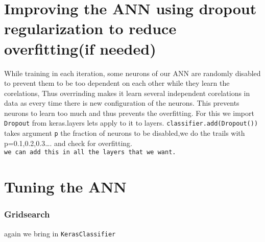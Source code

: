 \documentclass[11pt]{article}
\begin{document}
    \hypertarget{improving-the-ann-using-dropout-regularization-to-reduce-overfittingif-needed}{%
\section{Improving the ANN using dropout regularization to reduce
overfitting(if
needed)}\label{improving-the-ann-using-dropout-regularization-to-reduce-overfittingif-needed}}

    While training in each iteration, some neurons of our ANN are randomly
disabled to prevent them to be too dependent on each other while they
learn the corelations, Thus overrinding makes it learn several
independent corelations in data as every time there is new configuration
of the neurons. This prevents neurons to learn too much and thus
prevents the overfitting. For this we import \texttt{Dropout} from
keras.layers lets apply to it to layers.
\texttt{classifier.add(Dropout())} takes argument \texttt{p} the
fraction of neurons to be disabled,we do the trails with
p=0.1,0.2,0.3\ldots{}. and check for overfitting.
\texttt{we\ can\ add\ this\ in\ all\ the\ layers\ that\ we\ want.}

    \hypertarget{tuning-the-ann}{%
\section{Tuning the ANN}\label{tuning-the-ann}}

    \hypertarget{gridsearch}{%
\subsubsection{Gridsearch}\label{gridsearch}}

again we bring in \texttt{KerasClassifier}
\end{document}
